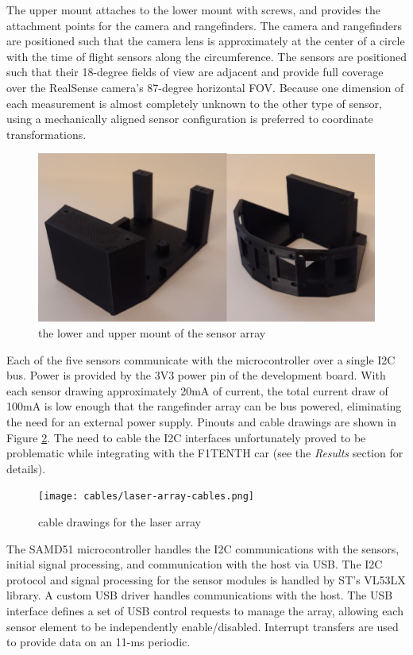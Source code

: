 \documentclass[conference]{IEEEtran}
\begin{document}
The upper mount attaches to the lower mount with screws, and provides the
attachment points for the camera and rangefinders. The camera and rangefinders
are positioned such that the camera lens is approximately at the center of a
circle with the time of flight sensors along the circumference. The sensors are
positioned such that their 18-degree fields of view are adjacent and provide
full coverage over the RealSense camera's 87-degree horizontal FOV. Because one
dimension of each measurement is almost completely unknown to the other type
of sensor, using a mechanically aligned sensor configuration is preferred to
coordinate transformations.

\begin{figure}
\centering
\includegraphics[scale=0.20]{split-mount.png}
\caption{the lower and upper mount of the sensor array}
\label{fig:split-mount}
\end{figure}

Each of the five sensors communicate with the microcontroller over a single I2C
bus. Power is provided by the 3V3 power pin of the development board. With each
sensor drawing approximately 20mA of current, the total current draw of 100mA
is low enough that the rangefinder array can be bus powered, eliminating the
need for an external power supply. Pinouts and cable drawings are shown in
Figure \ref{fig:cable-drawings}. The need to cable the I2C interfaces
unfortunately proved to be problematic while integrating with the F1TENTH car
(see the \textit{Results} section for details).

\begin{figure}
\centering
\texttt{[image: cables/laser-array-cables.png]}
\caption{cable drawings for the laser array}
\label{fig:cable-drawings}
\end{figure}

The SAMD51 microcontroller handles the I2C communications with the sensors,
initial signal processing, and communication with the host via USB. The I2C
protocol and signal processing for the sensor modules is handled by ST's VL53LX
library. A custom USB driver handles communications with the host. The USB
interface defines a set of USB control requests to manage the array, allowing
each sensor element to be independently enable/disabled. Interrupt transfers
are used to provide data on an 11-ms periodic.
\end{document}
